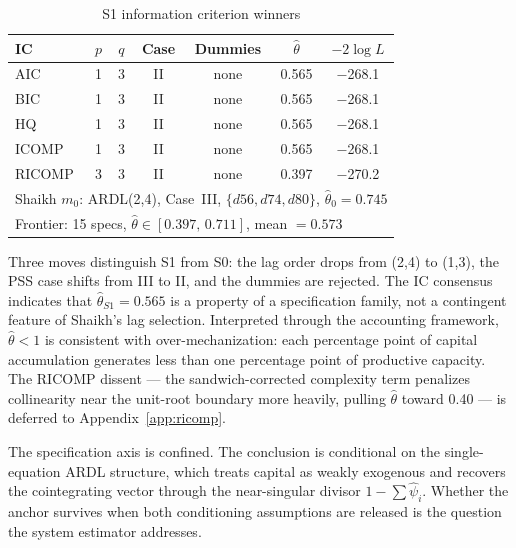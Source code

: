 \documentclass[11pt,a4paper]{article}
\begin{document}
\begin{table}[!ht]
	\centering
	\small
	\caption{S1 information criterion winners}
	\label{tab:S1_ic_winners}
	\begin{tabular}{lcccccc}
		\hline\hline
		IC & $p$ & $q$ & Case & Dummies & $\hat{\theta}$ & $-2\log L$ \\
		\hline
		AIC   & 1 & 3 & II & none & 0.565 & $-$268.1 \\
		BIC   & 1 & 3 & II & none & 0.565 & $-$268.1 \\
		HQ    & 1 & 3 & II & none & 0.565 & $-$268.1 \\
		ICOMP & 1 & 3 & II & none & 0.565 & $-$268.1 \\
		RICOMP & 3 & 3 & II & none & 0.397 & $-$270.2 \\
		\hline
		\multicolumn{7}{l}{\footnotesize
			Shaikh $m_0$: ARDL(2,4), Case~III,
			$\{d56,d74,d80\}$, $\hat{\theta}_0 = 0.745$} \\
		\multicolumn{7}{l}{\footnotesize
			Frontier: 15 specs,
			$\hat{\theta} \in [0.397,\, 0.711]$, mean $= 0.573$} \\
	\end{tabular}
\end{table}

Three moves distinguish S1 from S0: the lag order drops from (2,4) to
(1,3), the PSS case shifts from III to II, and the dummies are rejected.
The IC consensus indicates that $\hat{\theta}_{S1} = 0.565$ is a property
of a specification family, not a contingent feature of Shaikh's lag
selection. Interpreted through the accounting framework, $\hat{\theta} < 1$
is consistent with over-mechanization: each percentage point of capital
accumulation generates less than one percentage point of productive
capacity. The RICOMP dissent --- the sandwich-corrected complexity term
penalizes collinearity near the unit-root boundary more heavily,
pulling $\hat{\theta}$ toward 0.40 --- is deferred to
Appendix~\ref{app:ricomp}.

The specification axis is confined. The conclusion is conditional on the
single-equation ARDL structure, which treats capital as weakly exogenous and
recovers the cointegrating vector through the near-singular divisor
$1 - \sum\hat{\psi}_i$. Whether the anchor survives when both conditioning
assumptions are released is the question the system estimator addresses.


\end{document}
